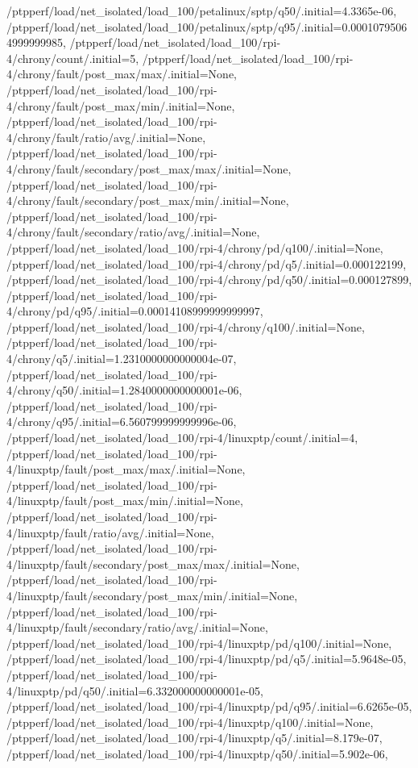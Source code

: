 {    /ptpperf/load/net_isolated/load_100/petalinux/sptp/q50/.initial=4.3365e-06,
    /ptpperf/load/net_isolated/load_100/petalinux/sptp/q95/.initial=0.00010795064999999985,
    /ptpperf/load/net_isolated/load_100/rpi-4/chrony/count/.initial=5,
    /ptpperf/load/net_isolated/load_100/rpi-4/chrony/fault/post_max/max/.initial=None,
    /ptpperf/load/net_isolated/load_100/rpi-4/chrony/fault/post_max/min/.initial=None,
    /ptpperf/load/net_isolated/load_100/rpi-4/chrony/fault/ratio/avg/.initial=None,
    /ptpperf/load/net_isolated/load_100/rpi-4/chrony/fault/secondary/post_max/max/.initial=None,
    /ptpperf/load/net_isolated/load_100/rpi-4/chrony/fault/secondary/post_max/min/.initial=None,
    /ptpperf/load/net_isolated/load_100/rpi-4/chrony/fault/secondary/ratio/avg/.initial=None,
    /ptpperf/load/net_isolated/load_100/rpi-4/chrony/pd/q100/.initial=None,
    /ptpperf/load/net_isolated/load_100/rpi-4/chrony/pd/q5/.initial=0.000122199,
    /ptpperf/load/net_isolated/load_100/rpi-4/chrony/pd/q50/.initial=0.000127899,
    /ptpperf/load/net_isolated/load_100/rpi-4/chrony/pd/q95/.initial=0.00014108999999999997,
    /ptpperf/load/net_isolated/load_100/rpi-4/chrony/q100/.initial=None,
    /ptpperf/load/net_isolated/load_100/rpi-4/chrony/q5/.initial=1.2310000000000004e-07,
    /ptpperf/load/net_isolated/load_100/rpi-4/chrony/q50/.initial=1.2840000000000001e-06,
    /ptpperf/load/net_isolated/load_100/rpi-4/chrony/q95/.initial=6.560799999999996e-06,
    /ptpperf/load/net_isolated/load_100/rpi-4/linuxptp/count/.initial=4,
    /ptpperf/load/net_isolated/load_100/rpi-4/linuxptp/fault/post_max/max/.initial=None,
    /ptpperf/load/net_isolated/load_100/rpi-4/linuxptp/fault/post_max/min/.initial=None,
    /ptpperf/load/net_isolated/load_100/rpi-4/linuxptp/fault/ratio/avg/.initial=None,
    /ptpperf/load/net_isolated/load_100/rpi-4/linuxptp/fault/secondary/post_max/max/.initial=None,
    /ptpperf/load/net_isolated/load_100/rpi-4/linuxptp/fault/secondary/post_max/min/.initial=None,
    /ptpperf/load/net_isolated/load_100/rpi-4/linuxptp/fault/secondary/ratio/avg/.initial=None,
    /ptpperf/load/net_isolated/load_100/rpi-4/linuxptp/pd/q100/.initial=None,
    /ptpperf/load/net_isolated/load_100/rpi-4/linuxptp/pd/q5/.initial=5.9648e-05,
    /ptpperf/load/net_isolated/load_100/rpi-4/linuxptp/pd/q50/.initial=6.332000000000001e-05,
    /ptpperf/load/net_isolated/load_100/rpi-4/linuxptp/pd/q95/.initial=6.6265e-05,
    /ptpperf/load/net_isolated/load_100/rpi-4/linuxptp/q100/.initial=None,
    /ptpperf/load/net_isolated/load_100/rpi-4/linuxptp/q5/.initial=8.179e-07,
    /ptpperf/load/net_isolated/load_100/rpi-4/linuxptp/q50/.initial=5.902e-06,
}
